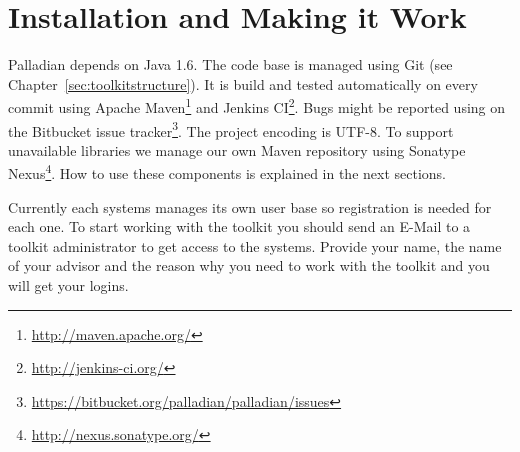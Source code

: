 \chapter{Installation and Making it Work}
Palladian depends on Java 1.6. %
The code base is managed using Git (see Chapter~\ref{sec:toolkitstructure}). It is build and tested automatically on every commit using Apache Maven\footnote{\url{http://maven.apache.org/}} and Jenkins CI\footnote{\url{http://jenkins-ci.org/}}. Bugs might be reported using on the Bitbucket issue tracker\footnote{\url{https://bitbucket.org/palladian/palladian/issues}}. The project encoding is UTF-8. To support unavailable libraries we manage our own Maven repository using Sonatype Nexus\footnote{\url{http://nexus.sonatype.org/}}. How to use these components is explained in the next sections.

Currently each systems manages its own user base so registration is needed for each one. To start working with the toolkit you should send an E-Mail to a toolkit administrator to get access to the systems. Provide your name, the name of your advisor and the reason why you need to work with the toolkit and you will get your logins.
